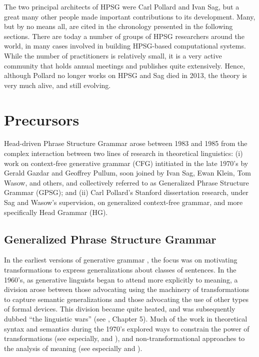 \documentclass[output=paper]{langsci/langscibook}
\begin{document}
The two principal architects of HPSG were Carl Pollard and Ivan Sag, but a great many other people made important contributions to its development.  Many, but by no means all, are cited in the chronology presented in the following sections.  There are today a number of groups of HPSG researchers around the world, in many cases involved in building HPSG-based computational systems.  While the number of practitioners is relatively small, it is a very active community that holds annual meetings and publishes quite extensively.  Hence, although Pollard no longer works on HPSG and Sag died in 2013, the theory is very much alive, and still evolving. 

\section{Precursors}

Head-driven Phrase Structure Grammar arose between 1983 and 1985 from the complex interaction between two lines of research in theoretical linguistics: (i) work on context-free generative grammar (CFG) intitiated in the late 1970's by Gerald Gazdar and Geoffrey Pullum, soon joined by Ivan Sag, Ewan Klein, Tom Wasow, and others, and collectively referred to as Generalized Phrase Structure Grammar (GPSG); and (ii) Carl Pollard's Stanford dissertation research, under Sag and Wasow's supervision, on generalized context-free grammar, and more specifically Head Grammar (HG).

\subsection{Generalized Phrase Structure Grammar}

In the earliest versions of generative grammar \citep{Chomsky57a}, the focus was on motivating transformations to express generalizations about classes of sentences.  In the 1960's, as generative linguists began to attend more explicitly to meaning, a division arose between those advocating using the machinery of transformations to capture semantic generalizations and those advocating the use of other types of formal devices.  This division became quite heated, and was subsequently dubbed ``the linguistic wars'' (see \citet{Newmeyer:1980}, Chapter 5).  Much of the work in theoretical syntax and semantics during the 1970's explored ways to constrain the power of transformations (see especially, \citet{Chomsky73a} and \citet{ChomLas1977}), and non-transformational approaches to the analysis of meaning (see especially \citet{Montague74a-ed} and \citet{Partee75a-u}).
\end{document}
